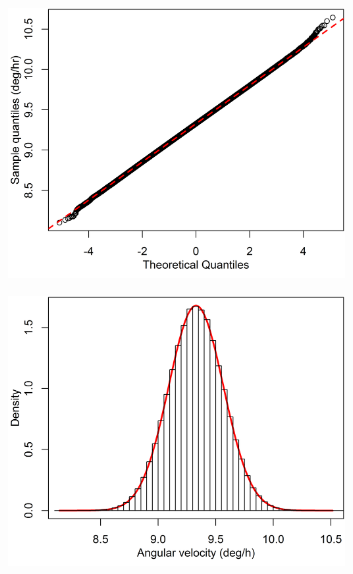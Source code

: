 \begin{figure}[!ht]

\begin{subfigure}[b]{0.5\textwidth}
		\centering
		\includegraphics[width=0.98\textwidth]{Figures/qqplot_11005.png} 
		\caption{}
		\label{subfig:probplot11005}
\end{subfigure}
\begin{subfigure}[b]{0.5\textwidth}
		\centering
		\includegraphics[width=0.98\textwidth]{Figures/distrib_11005.png} 
		\caption{}
		\label{subfig:density11005}
\end{subfigure}

\end{figure}
